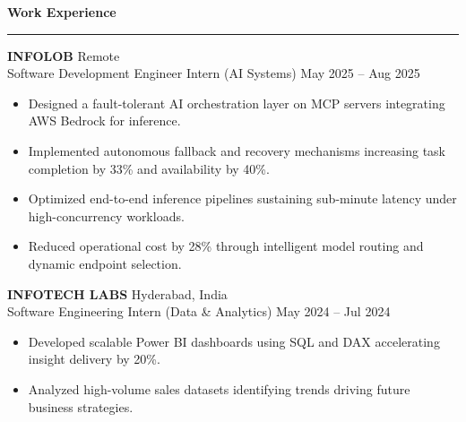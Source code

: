 \documentclass{article} %
\newcommand{\sectionheader}[1]{\vspace{0.1in}\noindent\color{black}\Large\textbf{#1}\par\rule{\linewidth}{0.8pt}\vspace{-0.1in}} %
\begin{document}
\sectionheader{Work Experience}
\vspace{-5pt}
\noindent\textbf{INFOLOB} \hfill Remote \\
Software Development Engineer Intern (AI Systems) \hfill May 2025 – Aug 2025
\begin{itemize}
    \item Designed a fault-tolerant AI orchestration layer on MCP servers integrating AWS Bedrock for inference.
    \item Implemented autonomous fallback and recovery mechanisms increasing task completion by 33\% and availability by 40\%.
    \item Optimized end-to-end inference pipelines sustaining sub-minute latency under high-concurrency workloads.
    \item Reduced operational cost by 28\% through intelligent model routing and dynamic endpoint selection.
\end{itemize}

\vspace{5pt}
\noindent\textbf{INFOTECH LABS} \hfill Hyderabad, India \\
Software Engineering Intern (Data \& Analytics) \hfill May 2024 – Jul 2024
\begin{itemize}
    \item Developed scalable Power BI dashboards using SQL and DAX accelerating insight delivery by 20\%.
    \item Analyzed high-volume sales datasets identifying trends driving future business strategies.
\end{itemize}
\end{document}
